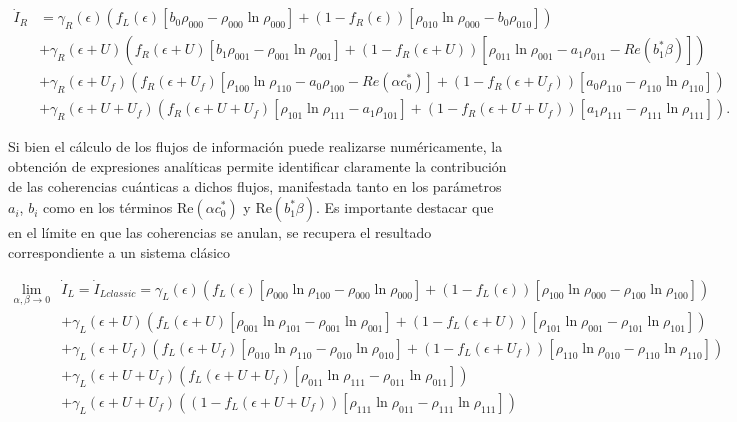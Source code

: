 \begin{appendixs}
\begin{align*}
    \dot{I}_{R} &  =  \gamma_{R}(\epsilon)(f_{L}(\epsilon)[b_{0}\rho_{000} - \rho_{000}\ln \rho_{000}] + (1-f_{R}(\epsilon))[\rho_{010}\ln \rho_{000} - b_{0}\rho_{010} ] )  \\ 
      & + \gamma_{R}(\epsilon + U)(f_{R}(\epsilon + U)[b_{1} \rho_{001} - \rho_{001}\ln \rho_{001}] + (1-f_{R}(\epsilon + U))[\rho_{011}\ln \rho_{001} -a_{1}\rho_{011} - Re(b^{*}_{1}\beta ) ]   ) \\  
      & + \gamma_{R}(\epsilon + U_{f})( f_{R}(\epsilon + U_{f})[\rho_{100}\ln \rho_{110} -a_{0}\rho_{100} - Re(\alpha c^{*}_{0}) ]  + (1-f_{R}(\epsilon + U_{f}))[a_{0}\rho_{110} - \rho_{110}\ln \rho_{110} ] ) \\  
      & + \gamma_{R}(\epsilon + U + U_{f})( f_{R}(\epsilon + U + U_{f})[\rho_{101}\ln \rho_{111}- a_{1}\rho_{101}] + (1-f_{R}(\epsilon+U+U_{f}) )[a_{1}\rho_{111} - \rho_{111}\ln \rho_{111}]  ). 
\end{align*}

Si bien el cálculo de los flujos de información puede realizarse numéricamente, la obtención de expresiones analíticas permite identificar claramente la contribución de las coherencias cuánticas a dichos flujos, manifestada tanto en los parámetros $a_i$, $b_i$ como en los términos $\mathrm{Re}(\alpha c_0^*)$ y $\mathrm{Re}(b_1^* \beta)$. 
Es importante destacar que en el límite en que las coherencias se anulan, se recupera el resultado correspondiente a un sistema clásico

\begin{align*}
 \lim_{\alpha,\beta \to 0}  & \dot{I}_{L}  = \dot{I}_{Lclassic}   =  \gamma_{L}(\epsilon)(f_{L}(\epsilon)[\rho_{000}\ln \rho_{100} - \rho_{000}\ln \rho_{000}] + (1-f_{L}(\epsilon))[\rho_{100}\ln \rho_{000} - \rho_{100}\ln \rho_{100} ] )  \\ 
      & + \gamma_{L}(\epsilon + U)(f_{L}(\epsilon + U)[\rho_{001}\ln \rho_{101} - \rho_{001}\ln \rho_{001}] + (1-f_{L}(\epsilon + U))[\rho_{101}\ln \rho_{001} -\rho_{101}\ln \rho_{101} ]   ) \\  
      & + \gamma_{L}(\epsilon + U_{f})( f_{L}(\epsilon + U_{f})[\rho_{010}\ln \rho_{110} -\rho_{010}\ln \rho_{010} ]  + (1-f_{L}(\epsilon + U_{f}))[\rho_{110}\ln \rho_{010} - \rho_{110}\ln \rho_{110} ] ) \\  
      & + \gamma_{L}(\epsilon + U + U_{f})( f_{L}(\epsilon + U + U_{f})[\rho_{011}\ln \rho_{111}- \rho_{011}\ln \rho_{011}]) \\   
      & + \gamma_{L}(\epsilon + U + U_{f})( (1-f_{L}(\epsilon+U+U_{f}) )[\rho_{111}\ln \rho_{011} - \rho_{111}\ln \rho_{111}])   
\end{align*}


\end{appendixs}

